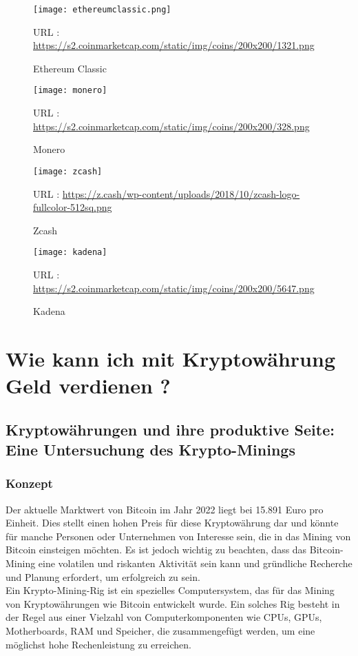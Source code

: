 \documentclass[ngerman]{scrreprt}
\begin{document}
	\begin{figure}[H]
		\centering
		\texttt{[image: ethereumclassic.png]}
		\caption{Ethereum Classic}
		\small URL : \url{https://s2.coinmarketcap.com/static/img/coins/200x200/1321.png}
	\end{figure} 
	\begin{figure}[H]
		\centering
		\texttt{[image: monero]}
		\caption{Monero}
		\small URL : \url{https://s2.coinmarketcap.com/static/img/coins/200x200/328.png}
	\end{figure} 
	\begin{figure}[H]
		\centering
		\texttt{[image: zcash]}
		\caption{Zcash}
		\small URL : \url{https://z.cash/wp-content/uploads/2018/10/zcash-logo-fullcolor-512sq.png}
	\end{figure} 
	\begin{figure}[H]
		\centering
		\texttt{[image: kadena]}
		\caption{Kadena}
		\small URL : \url{https://s2.coinmarketcap.com/static/img/coins/200x200/5647.png}
	\end{figure} 

\section{Wie kann ich mit Kryptowährung Geld verdienen ?}
\subsection{Kryptowährungen und ihre produktive Seite: Eine Untersuchung des Krypto-Minings}
\subsubsection{Konzept}
Der aktuelle Marktwert von Bitcoin im Jahr 2022 liegt bei 15.891 Euro pro Einheit. Dies stellt einen hohen Preis für diese Kryptowährung dar und könnte für manche Personen oder Unternehmen von Interesse sein, die in das Mining von Bitcoin einsteigen möchten. Es ist jedoch wichtig zu beachten, dass das Bitcoin-Mining eine volatilen und riskanten Aktivität sein kann und gründliche Recherche und Planung erfordert, um erfolgreich zu sein.  \\ 
Ein Krypto-Mining-Rig ist ein spezielles Computersystem, das für das Mining von Kryptowährungen wie Bitcoin entwickelt wurde. Ein solches Rig besteht in der Regel aus einer Vielzahl von Computerkomponenten wie CPUs, GPUs, Motherboards, RAM und Speicher, die zusammengefügt werden, um eine möglichst hohe Rechenleistung zu erreichen. \\ 
\end{document}
